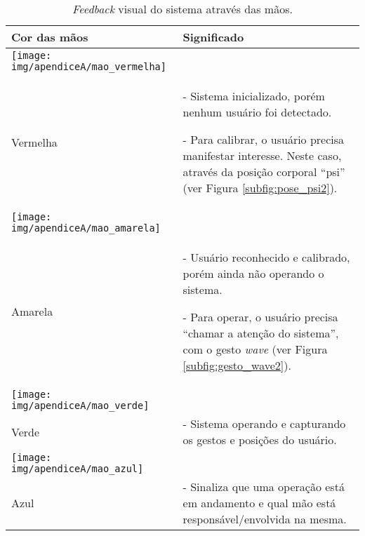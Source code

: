 \pagebreak

\renewcommand{\tablename}{Quadro}

\begin{table}[!htbp]
\caption{\textit{Feedback} visual do sistema através das mãos.}
\label{tab:significado_cor_maos}
\begin{center}
\begin{tabular}{| >{\centering}m{2.8cm} | p{12cm} |}
\hline

\cellcolor[gray]{0.9} \textbf{Cor das mãos} & 
\centering \cellcolor[gray]{0.9} \textbf{Significado}
\tabularnewline
\hline

\texttt{[image: img/apendiceA/mao\_vermelha]}\\Vermelha & 
- Sistema inicializado, porém nenhum usuário foi detectado.

- Para calibrar, o usuário precisa manifestar interesse. Neste caso, através da posição corporal ``psi'' (ver Figura \ref{subfig:pose_psi2}).
\tabularnewline
\hline

\texttt{[image: img/apendiceA/mao\_amarela]}\\Amarela & 
- Usuário reconhecido e calibrado, porém ainda não operando o sistema.

- Para operar, o usuário precisa ``chamar a atenção do sistema'', com o gesto \textit{wave} (ver Figura \ref{subfig:gesto_wave2}).
\tabularnewline
\hline

\texttt{[image: img/apendiceA/mao\_verde]}\\Verde & 
- Sistema operando e capturando os gestos e posições do usuário.
\tabularnewline
\hline

\texttt{[image: img/apendiceA/mao\_azul]}\\Azul & 
- Sinaliza que uma operação está em andamento e qual mão está responsável/envolvida na mesma.
\tabularnewline
\hline

\end{tabular}
\end{center}
\end{table}

